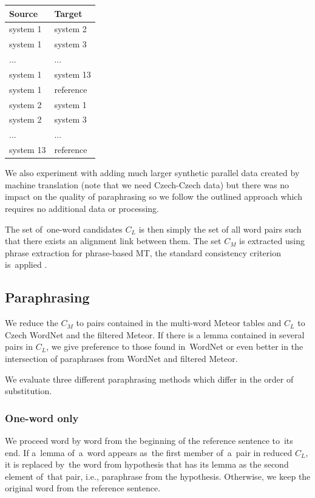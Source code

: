 \documentclass[11pt]{article}
\begin{document}
\begin{center}
\begin{tabular}{ll}
Source & Target \\
\hline
system 1 & system 2 \\
system 1 & system 3 \\
... & ...\\
system 1 & system 13 \\
system 1 & reference \\
system 2 & system 1 \\
system 2 & system 3 \\
... & ... \\
system 13 & reference \\
\end{tabular}
\end{center}

We also experiment with adding much larger synthetic parallel data created by
machine translation (note that we need Czech-Czech data) but there was no 
impact on the quality of paraphrasing so we follow the outlined approach which 
requires no additional data or processing.

The set of~one-word candidates $C_L$ is then simply the set of all word pairs 
such that there exists an alignment link between them. The set $C_M$ is 
extracted using phrase extraction for phrase-based MT, the standard consistency 
criterion is~applied \cite{Och99improvedalignment}.

\subsection{Paraphrasing}
We reduce the $ C_{M} $ to pairs contained in the multi-word Meteor tables and
$ C_{L} $ to Czech WordNet and the filtered Meteor. If there is a lemma 
contained in several pairs in $ C_{L} $, we  give preference to those found 
in~WordNet or even better in the intersection of paraphrases from WordNet and 
filtered Meteor.

We evaluate three different paraphrasing methods which differ in the order of
substitution.

\subsubsection*{One-word only}
We proceed word by word from the beginning of the reference 
sentence to~its end. If a~lemma of~a~word appears as~the first member of~a~pair 
in reduced $ C_{L} $, it is replaced by~the word from hypothesis that has its lemma
as the second element of~that pair, i.e., paraphrase from the hypothesis. Otherwise, 
we keep the original word from the reference sentence.
\end{document}
